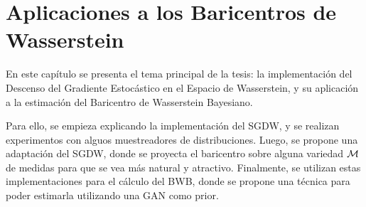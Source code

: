 \chapter{Aplicaciones a los Baricentros de Wasserstein}

En este capítulo se presenta el tema principal de la tesis: la implementación del Descenso del Gradiente Estocástico en el Espacio de Wasserstein, y su aplicación a la estimación del Baricentro de Wasserstein Bayesiano.

Para ello, se empieza explicando la implementación del SGDW, y se realizan experimentos con alguos muestreadores de distribuciones. Luego, se propone una adaptación del SGDW, donde se proyecta el baricentro sobre alguna variedad $\operatorname{\mathcal{M}}$ de medidas para que se vea más natural y atractivo. Finalmente, se utilizan estas implementaciones para el cálculo del BWB, donde se propone una técnica para poder estimarla utilizando una GAN como prior.



